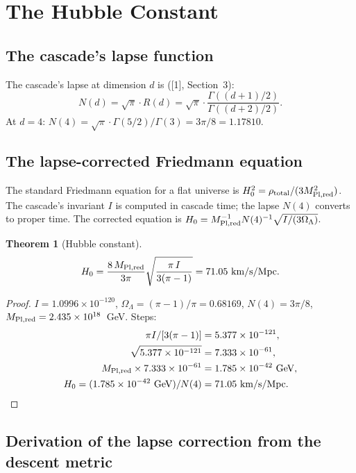 \documentclass[12pt,a4paper]{article}
\newtheorem{theorem}{Theorem}[section]
\begin{document}
\section{The Hubble Constant}

\subsection{The cascade's lapse function}

The cascade's lapse at dimension $d$ is ([1], Section~3):
\[
N(d) = \sqrt{\pi} \cdot R(d) = \sqrt{\pi} \cdot \frac{\Gamma((d+1)/2)}{\Gamma((d+2)/2)}.
\]
At $d = 4$: $N(4) = \sqrt{\pi} \cdot \Gamma(5/2)/\Gamma(3) = 3\pi/8 = 1.17810$.

\subsection{The lapse-corrected Friedmann equation}

The standard Friedmann equation for a flat universe is $H_0^2 = \rho_{\rm total}/(3M_{\rm Pl,red}^2)$.
The cascade's invariant $I$ is computed in cascade time; the lapse $N(4)$ converts to
proper time. The corrected equation is $H_0 = M_{\rm Pl,red}^{-1} N(4)^{-1}\sqrt{I/(3\Omega_\Lambda)}$.

\begin{theorem}[Hubble constant]\label{thm:H0}
\begin{equation}
H_0 = \frac{8\,M_{\rm Pl,red}}{3\pi}\sqrt{\frac{\pi\,I}{3(\pi-1)}} = 71.05~\text{km/s/Mpc}.\label{eq:H0}
\end{equation}
\end{theorem}

\begin{proof}
$I = 1.0996 \times 10^{-120}$, $\Omega_\Lambda = (\pi-1)/\pi = 0.68169$, $N(4) = 3\pi/8$,
$M_{\rm Pl,red} = 2.435 \times 10^{18}$~GeV. Steps:
\begin{align*}
\pi I/[3(\pi-1)] &= 5.377 \times 10^{-121},\\
\sqrt{5.377 \times 10^{-121}} &= 7.333 \times 10^{-61},\\
M_{\rm Pl,red} \times 7.333 \times 10^{-61} &= 1.785 \times 10^{-42}~\text{GeV},\\
H_0 = (1.785 \times 10^{-42}~\text{GeV})/N(4) &= 71.05~\text{km/s/Mpc}.\qedhere
\end{align*}
\end{proof}

\subsection{Derivation of the lapse correction from the descent metric}
\end{document}

